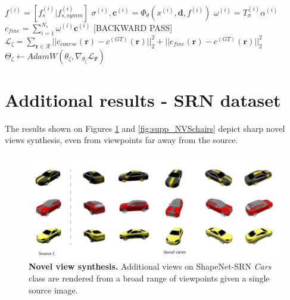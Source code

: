 \begin{algorithm}[htbp]
{{        $f^{(i)} = [f_{s}^{(i)} | f_{s,symm}^{(i)}]$
        $\sigma^{(i)},\mathbf{c}^{(i)} = \Phi_{\theta}(x^{(i)},\mathbf{d},f^{(i)})$ 
        $\omega^{(i)} = T_{\sigma}^{(i)}\alpha^{(i)}$ 
        }
        $c_{fine} = \sum_{i=1}^{N_{s}}\omega^{(i)}\textbf{c}^{(i)}$ 
  \;
  \textcolor{red!50}{[BACKWARD PASS]}\;
    $\mathcal{L}_{\zeta}= \sum_{\mathbf{r}\in\mathcal{R}} || c_{coarse}(\mathbf{r}) - c^{(GT)}(\mathbf{r}) ||_{2}^{2} +|| c_{fine}(\mathbf{r}) - c^{(GT)}(\mathbf{r}) ||_{2}^{2}$
    $\Theta_{\zeta} \gets AdamW(\theta_{\zeta},\nabla_{\theta_{\zeta}} \mathcal{L}_{\Psi})$ 
    }
\end{algorithm}


\section{Additional results - SRN dataset }
\label{appendix:moreres-epinerf}

The results shown on Figures \ref{fig:supp_NVScars} and \ref{fig:supp_NVSchairs} depict  sharp novel views synthesis, even from viewpoints far away from the source. 

\begin{figure}[htp!]
   \begin{center}
  \includegraphics[width=\linewidth]{images/epinerf/supp_NVS_Cars.png}
  \caption{\textbf{Novel view synthesis.} Additional views on ShapeNet-SRN \textit{Cars} class are rendered from a broad range of viewpoints given a single source image. }
  \label{fig:supp_NVScars}
  \end{center}
\end{figure}


